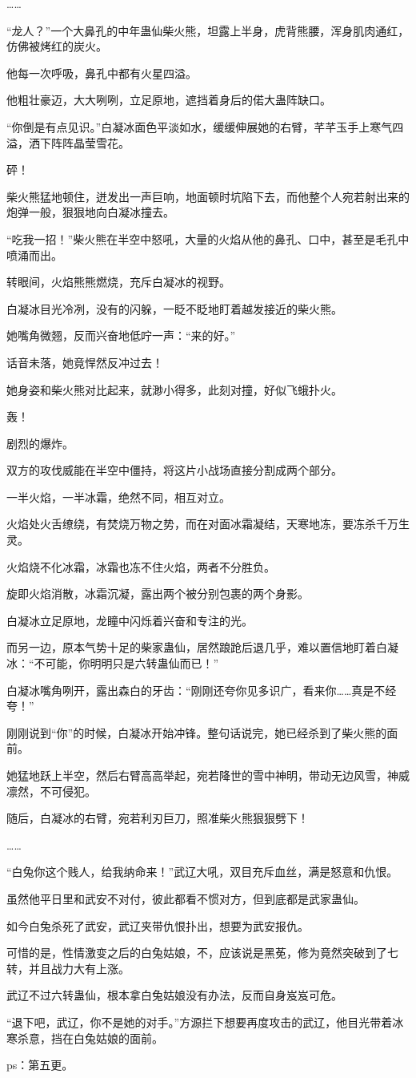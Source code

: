\begin{this_body}
……

“龙人？”一个大鼻孔的中年蛊仙柴火熊，坦露上半身，虎背熊腰，浑身肌肉通红，仿佛被烤红的炭火。

他每一次呼吸，鼻孔中都有火星四溢。

他粗壮豪迈，大大咧咧，立足原地，遮挡着身后的偌大蛊阵缺口。

“你倒是有点见识。”白凝冰面色平淡如水，缓缓伸展她的右臂，芊芊玉手上寒气四溢，洒下阵阵晶莹雪花。

砰！

柴火熊猛地顿住，迸发出一声巨响，地面顿时坑陷下去，而他整个人宛若射出来的炮弹一般，狠狠地向白凝冰撞去。

“吃我一招！”柴火熊在半空中怒吼，大量的火焰从他的鼻孔、口中，甚至是毛孔中喷涌而出。

转眼间，火焰熊熊燃烧，充斥白凝冰的视野。

白凝冰目光冷冽，没有的闪躲，一眨不眨地盯着越发接近的柴火熊。

她嘴角微翘，反而兴奋地低咛一声：“来的好。”

话音未落，她竟悍然反冲过去！

她身姿和柴火熊对比起来，就渺小得多，此刻对撞，好似飞蛾扑火。

轰！

剧烈的爆炸。

双方的攻伐威能在半空中僵持，将这片小战场直接分割成两个部分。

一半火焰，一半冰霜，绝然不同，相互对立。

火焰处火舌缭绕，有焚烧万物之势，而在对面冰霜凝结，天寒地冻，要冻杀千万生灵。

火焰烧不化冰霜，冰霜也冻不住火焰，两者不分胜负。

旋即火焰消散，冰霜沉凝，露出两个被分别包裹的两个身影。

白凝冰立足原地，龙瞳中闪烁着兴奋和专注的光。

而另一边，原本气势十足的柴家蛊仙，居然踉跄后退几乎，难以置信地盯着白凝冰：“不可能，你明明只是六转蛊仙而已！”

白凝冰嘴角咧开，露出森白的牙齿：“刚刚还夸你见多识广，看来你……真是不经夸！”

刚刚说到“你”的时候，白凝冰开始冲锋。整句话说完，她已经杀到了柴火熊的面前。

她猛地跃上半空，然后右臂高高举起，宛若降世的雪中神明，带动无边风雪，神威凛然，不可侵犯。

随后，白凝冰的右臂，宛若利刃巨刀，照准柴火熊狠狠劈下！

……

“白兔你这个贱人，给我纳命来！”武辽大吼，双目充斥血丝，满是怒意和仇恨。

虽然他平日里和武安不对付，彼此都看不惯对方，但到底都是武家蛊仙。

如今白兔杀死了武安，武辽夹带仇恨扑出，想要为武安报仇。

可惜的是，性情激变之后的白兔姑娘，不，应该说是黑莬，修为竟然突破到了七转，并且战力大有上涨。

武辽不过六转蛊仙，根本拿白兔姑娘没有办法，反而自身岌岌可危。

“退下吧，武辽，你不是她的对手。”方源拦下想要再度攻击的武辽，他目光带着冰寒杀意，挡在白兔姑娘的面前。

ps：第五更。

\end{this_body}

